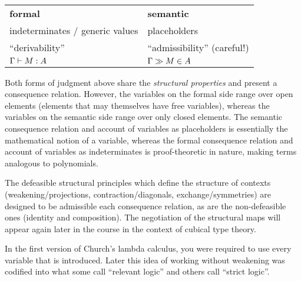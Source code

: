 \documentclass{article}
\begin{document}
\medskip
\begin{center}
  \begin{tabular}{ll}
    \textbf{formal} & \textbf{semantic}
    \\
    indeterminates / generic values & placeholders
    \\
    ``derivability'' & ``admissibility'' (careful!)
    \\
    $\hasEF{\Gamma}{M}{A}$ & $\hasEC{\Gamma}{M}{A}$
  \end{tabular}
\end{center}

Both forms of judgment above share the \emph{structural properties}
and present a consequence relation. However, the variables on the
formal side range over open elements (elements that may themselves
have free variables), whereas the variables on the semantic side range
over only closed elements. The semantic consequence relation and
account of variables as placeholders is essentially the mathematical
notion of a variable, whereas the formal consequence relation and
account of variables as indeterminates is proof-theoretic in nature,
making terms analogous to polynomials.

The defeasible structural principles which define the structure of
contexts (weakening/projections, contraction/diagonals,
exchange/symmetries) are designed to be admissible each consequence
relation, as are the non-defeasible ones (identity and
composition). The negotiation of the structural maps will appear again
later in the course in the context of cubical type theory.

\begin{remark}
  In the first version of Church's lambda calculus, you were required
  to use every variable that is introduced. Later this idea of working
  without weakening was codified into what some call ``relevant
  logic'' and others call ``strict logic''.
\end{remark}



\nocite{HoTTBook:13}


\end{document}
